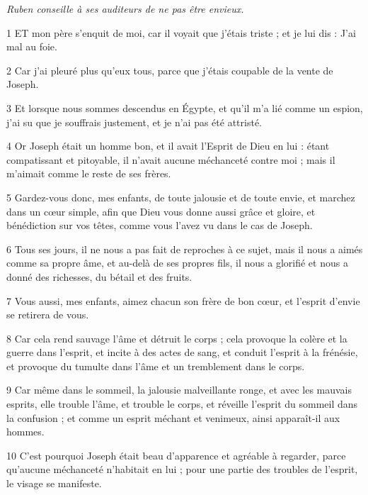 \par \textit{Ruben conseille à ses auditeurs de ne pas être envieux.}

\par 1 ET mon père s'enquit de moi, car il voyait que j'étais triste ; et je lui dis : J'ai mal au foie.

\par 2 Car j'ai pleuré plus qu'eux tous, parce que j'étais coupable de la vente de Joseph.

\par 3 Et lorsque nous sommes descendus en Égypte, et qu'il m'a lié comme un espion, j'ai su que je souffrais justement, et je n'ai pas été attristé.

\par 4 Or Joseph était un homme bon, et il avait l'Esprit de Dieu en lui : étant compatissant et pitoyable, il n'avait aucune méchanceté contre moi ; mais il m'aimait comme le reste de ses frères.

\par 5 Gardez-vous donc, mes enfants, de toute jalousie et de toute envie, et marchez dans un cœur simple, afin que Dieu vous donne aussi grâce et gloire, et bénédiction sur vos têtes, comme vous l'avez vu dans le cas de Joseph.

\par 6 Tous ses jours, il ne nous a pas fait de reproches à ce sujet, mais il nous a aimés comme sa propre âme, et au-delà de ses propres fils, il nous a glorifié et nous a donné des richesses, du bétail et des fruits.

\par 7 Vous aussi, mes enfants, aimez chacun son frère de bon cœur, et l'esprit d'envie se retirera de vous.

\par 8 Car cela rend sauvage l'âme et détruit le corps ; cela provoque la colère et la guerre dans l'esprit, et incite à des actes de sang, et conduit l'esprit à la frénésie, et provoque du tumulte dans l'âme et un tremblement dans le corps.

\par 9 Car même dans le sommeil, la jalousie malveillante ronge, et avec les mauvais esprits, elle trouble l'âme, et trouble le corps, et réveille l'esprit du sommeil dans la confusion ; et comme un esprit méchant et venimeux, ainsi apparaît-il aux hommes.

\par 10 C'est pourquoi Joseph était beau d'apparence et agréable à regarder, parce qu'aucune méchanceté n'habitait en lui ; pour une partie des troubles de l'esprit, le visage se manifeste.

